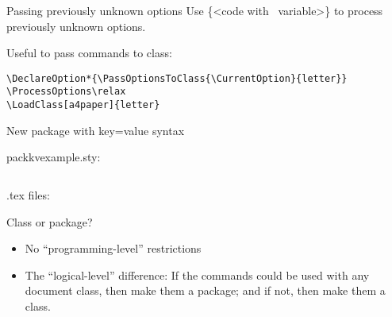 \begin{frame}[fragile]{Passing previously unknown options\magicPage}\relax
     Use \ccol\DeclareOption*\{<code with \ccol\CurrentOption\ variable>\} to process previously unknown options.
     
     Useful to pass commands to class:
     
     \begin{verbatim}
\DeclareOption*{\PassOptionsToClass{\CurrentOption}{letter}}
\ProcessOptions\relax
\LoadClass[a4paper]{letter}
    \end{verbatim}
\end{frame}

\begin{frame}[fragile]{New package with key=value syntax\magicPage}\relax

    packkvexample.sty:
    \inputminted[fontsize=\tiny]{latex}{sec03/code/packkvexample.sty}
    
    .tex files: 
    

\end{frame}


\begin{frame}{Class or package?}\relax
     \begin{itemize}
         \item No ``programming-level'' restrictions
         \item The ``logical-level'' difference: If the commands could be used with any document class, then make them a package; and if not, then make them a class.
          
     \end{itemize}
     
\end{frame}

